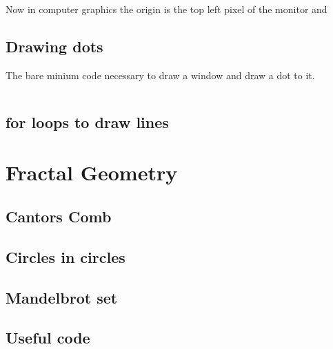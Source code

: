 \documentclass[12pt]{article}
\begin{document}
    Now in computer graphics the origin is the top left pixel of the monitor 
    and 
\subsection{Drawing dots}
    The bare minium code necessary to draw a window and draw a dot to it. 
    \inputminted{c}{draw_dot.c}
\subsection{for loops to draw lines}

\section{Fractal Geometry}
\subsection{Cantors Comb}
\subsection{Circles in circles}
\subsection{Mandelbrot set}

\begin{appendices}
    \section{Useful code}
    \inputminted{c++}{complex.hpp}
\end{appendices}
\end{document}
